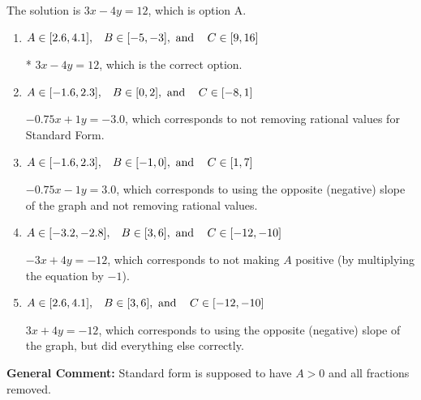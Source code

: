 \documentclass{extbook}[14pt]
\begin{document}
\begin{enumerate}
{The solution is \( 3x - 4y = 12 \), which is option A.\begin{enumerate}[label=\Alph*.]
\item \( A \in [2.6, 4.1], \hspace{3mm} B \in [-5, -3], \text{ and } \hspace{3mm} C \in [9, 16] \)

* $3x - 4y = 12$, which is the correct option.
\item \( A \in [-1.6, 2.3], \hspace{3mm} B \in [0, 2], \text{ and } \hspace{3mm} C \in [-8, 1] \)

 $-0.75x + 1y = -3.0$, which corresponds to not removing rational values for Standard Form.
\item \( A \in [-1.6, 2.3], \hspace{3mm} B \in [-1, 0], \text{ and } \hspace{3mm} C \in [1, 7] \)

 $-0.75x - 1y = 3.0$, which corresponds to using the opposite (negative) slope of the graph and not removing rational values.
\item \( A \in [-3.2, -2.8], \hspace{3mm} B \in [3, 6], \text{ and } \hspace{3mm} C \in [-12, -10] \)

 $-3x + 4y = -12$, which corresponds to not making $A$ positive (by multiplying the equation by $-1$).
\item \( A \in [2.6, 4.1], \hspace{3mm} B \in [3, 6], \text{ and } \hspace{3mm} C \in [-12, -10] \)

 $3x + 4y = -12$, which corresponds to using the opposite (negative) slope of the graph, but did everything else correctly.
\end{enumerate}

\textbf{General Comment:} Standard form is supposed to have $A > 0$ and all fractions removed.
}
\end{enumerate}
\end{document}
